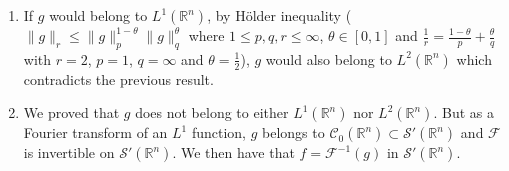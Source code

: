 \documentclass[a4paper, 12pt]{article}
\theoremstyle{plain}
\theoremstyle{definition}
\theoremstyle{remark}
\numberwithin{equation}{section}
\begin{document}
\begin{enumerate}
\begin{enumerate}
And therefore, $f$ would belong to $L^2({\mathds{R}}^n)$ which is not the case by our choice of $f$.
\item
If $g$ would belong to $L^1({\mathds{R}}^n)$, by H\"older inequality ($\|g\|_r\le \|g\|_p^{1-\theta}\|g\|_q^\theta$ where $1\le p,q,r\le \infty$, 
$\theta\in[0,1]$ and
$\frac{1}{r}=\frac{1-\theta}{p}+\frac{\theta}{q}$ with $r=2$, $p=1$, $q=\infty$ and $\theta=\frac{1}{2}$), $g$ would also belong to 
$L^2({\mathds{R}}^n)$ which contradicts the previous result.
\item
We proved that $g$ does not belong to either $L^1({\mathds{R}}^n)$ nor $L^2({\mathds{R}}^n)$. But as a Fourier transform of 
an $L^1$ function, $g$ belongs to ${\mathscr{C}}_0({\mathds{R}}^n)\subset {\mathscr{S}}'({\mathds{R}}^n)$ and ${\mathscr{F}}$
is invertible on ${\mathscr{S}}'({\mathds{R}}^n)$. We then have that $f={\mathscr{F}}^{-1}(g)$ in ${\mathscr{S}}'({\mathds{R}}^n)$.
\end{enumerate}
\end{enumerate}
\end{document}

